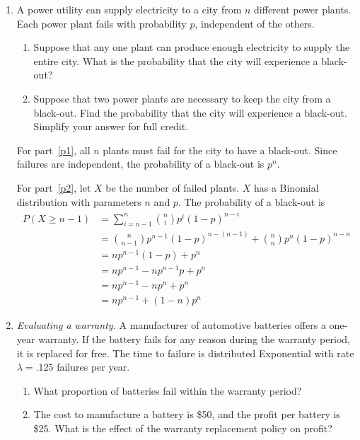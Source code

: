 \begin{enumerate}
\item A power utility can supply electricity to a city
from $n$ different power plants. Each power plant fails with
probability $p$, independent of the others.
\begin{enumerate}
\item Suppose that any one plant can produce enough electricity to
supply the entire city. What is the probability that the city will
experience a black-out? \label{p1}
\item Suppose that two power plants are necessary to keep the city
from a black-out. Find the probability that the city will
experience a black-out. Simplify your answer for full credit.
\label{p2}
\end{enumerate}

\begin{solution}
\bs
For part~\ref{p1}, all $n$ plants must fail for the city to
have a black-out. Since failures are independent, the probability
of a black-out is $p^n$.

For part~\ref{p2}, let $X$ be the number of failed plants. $X$
has a Binomial distribution with parameters $n$ and $p$. The probability
of a black-out is
\begin{align*}
  P(X \geq n-1) &= \sum_{i=n-1}^n {n \choose i} p^i (1-p)^{n-i} \\
                &= {n \choose n-1} p^{n-1} (1-p)^{n-(n-1)} + {n \choose n} p^n (1-p)^{n-n} \\
                &= np^{n-1}(1-p) + p^n \\
                &= np^{n-1} - np^{n-1}p + p^n\\
                &= np^{n-1} - np^n + p^n\\
                &= np^{n-1} + (1-n)p^n
\end{align*}
\end{solution}

\item \emph{Evaluating a warranty.}
  A manufacturer of automotive batteries offers a one-year
  warranty. If the battery fails for any reason during the warranty
  period, it is replaced for free. The time to failure is distributed
  Exponential with rate $\lambda=.125$ failures per year.
\begin{enumerate}
\item What proportion of batteries fail within the warranty period?
\item The cost to manufacture a battery is \$50, and the profit
per battery is \$25. What is the effect of the warranty replacement
policy on profit? \label{ex:profit}
\end{enumerate}


\end{enumerate}
